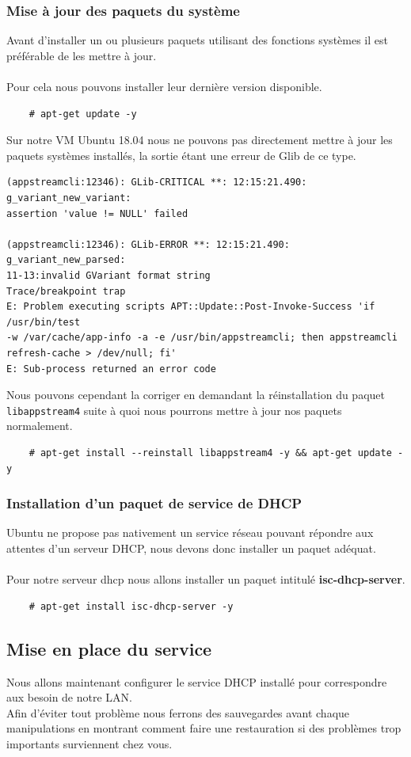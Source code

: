 \documentclass[a4paper]{article}
\begin{document}
\subsubsection{Mise à jour des paquets du système}
Avant d'installer un ou plusieurs paquets utilisant des fonctions systèmes il est préférable de les mettre à jour.\\\\Pour cela nous pouvons installer leur dernière version disponible.
\begin{lstlisting}
    # apt-get update -y
\end{lstlisting}
Sur notre VM Ubuntu 18.04 nous ne pouvons pas directement mettre à jour les paquets systèmes installés, la sortie étant une erreur de Glib de ce type.
\begin{lstlisting}
(appstreamcli:12346): GLib-CRITICAL **: 12:15:21.490: g_variant_new_variant: 
assertion 'value != NULL' failed

(appstreamcli:12346): GLib-ERROR **: 12:15:21.490: g_variant_new_parsed: 
11-13:invalid GVariant format string
Trace/breakpoint trap
E: Problem executing scripts APT::Update::Post-Invoke-Success 'if /usr/bin/test 
-w /var/cache/app-info -a -e /usr/bin/appstreamcli; then appstreamcli 
refresh-cache > /dev/null; fi'
E: Sub-process returned an error code
\end{lstlisting}
Nous pouvons cependant la corriger en demandant la réinstallation du paquet \verb|libappstream4| suite à quoi nous pourrons mettre à jour nos paquets normalement.
\begin{lstlisting}
    # apt-get install --reinstall libappstream4 -y && apt-get update -y
\end{lstlisting}
\subsubsection{Installation d'un paquet de service de DHCP}
Ubuntu ne propose pas nativement un service réseau pouvant répondre aux attentes d'un serveur DHCP, nous devons donc installer un paquet adéquat.\\\\Pour notre serveur dhcp nous allons installer un paquet intitulé \textbf{isc-dhcp-server}.
\begin{lstlisting}
    # apt-get install isc-dhcp-server -y
\end{lstlisting}
\subsection{Mise en place du service}
Nous allons maintenant configurer le service DHCP installé pour correspondre aux besoin de notre LAN.\\Afin d'éviter tout problème nous ferrons des sauvegardes avant chaque manipulations en montrant comment faire une restauration si des problèmes trop importants surviennent chez vous.
\end{document}
